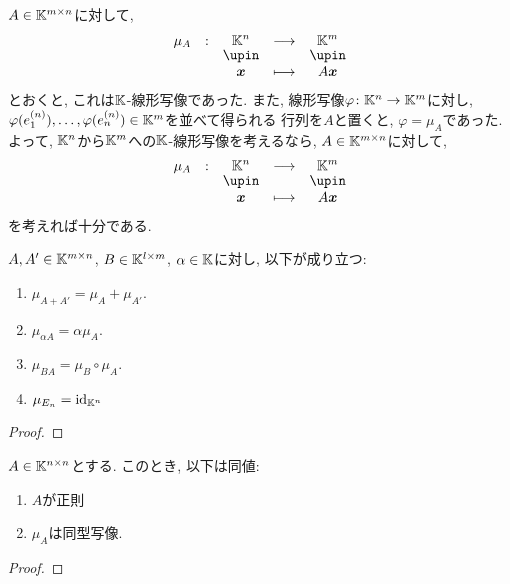 
$A\in\mathbb{K}^{m\times n}$に対して,
\begin{align*}
  \shazo{\mu_A}{\KK^n}{\KK^m}
        {\xx}
        {A\xx}
\end{align*}
とおくと, これは$\mathbb{K}$-線形写像であった.
また, 線形写像$\varphi\colon \mathbb{K}^n\to \mathbb{K}^m$に対し,
$\varphi(e^{(n)}_1),\ldots,\varphi(e^{(n)}_n)\in\mathbb{K}^m$を並べて得られる
行列を$A$と置くと,
$\varphi=\mu_A$であった.
よって, 
$\mathbb{K}^n$から$\mathbb{K}^m$への$\mathbb{K}$-線形写像を考えるなら,
$A\in\mathbb{K}^{m\times n}$に対して,
\begin{align*}
  \shazo{\mu_A}{\KK^n}{\KK^m}
        {\xx}
        {A\xx}
\end{align*}
を考えれば十分である.

\begin{prop}
  $A,A'\in \mathbb{K}^{m\times n}$,
  $B\in\mathbb{K}^{l\times m}$,
  $\alpha \in\mathbb{K}$に対し, 以下が成り立つ:
  \begin{enumerate}
  \item $\mu_{A+A'}=\mu_A+\mu_{A'}$.
  \item $\mu_{\alpha A}=\alpha\mu_A$.
  \item $\mu_{BA}=\mu_B\circ\mu_{A}$.
  \item $\mu_{E_n}=\operatorname{id}_{\mathbb{K}^n}$
  \end{enumerate}
\end{prop}
\begin{proof}\end{proof}

\begin{cor}
  $A\in \mathbb{K}^{n\times n}$とする.
  このとき,
  以下は同値:
  \begin{enumerate}
  \item $A$が正則
  \item $\mu_A$は同型写像.
  \end{enumerate}
\end{cor}
\begin{proof}\end{proof}


